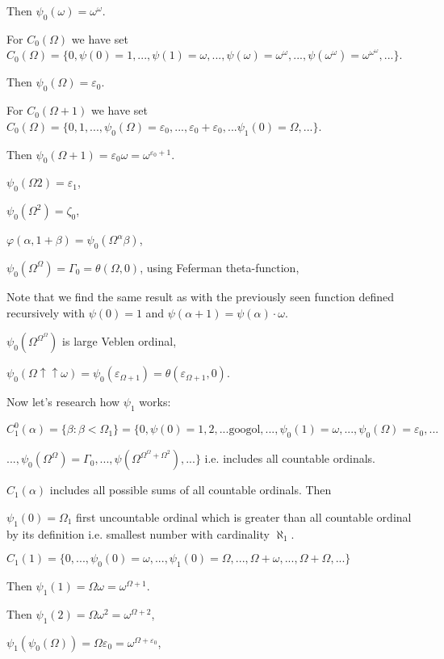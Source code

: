 \documentclass[10pt]{article}
\begin{document}
Then \(\psi_0(\omega)=\omega^\omega\).

For \(C_0(\Omega)\) we have set \(C_0(\Omega)=\{0,\psi(0)=1,...,\psi(1)=\omega,...,\psi(\omega)=\omega^\omega,...,\psi(\omega^\omega)=\omega^{\omega^\omega},...\}\).

Then \(\psi_0(\Omega)=\varepsilon_0\).

For \(C_0(\Omega+1)\) we have set \(C_0(\Omega)=\{0,1,...,\psi_0(\Omega)=\varepsilon_0,...,\varepsilon_0+\varepsilon_0,...\psi_1(0)=\Omega,...\}\).

Then \(\psi_0(\Omega+1)=\varepsilon_0\omega=\omega^{\varepsilon_0+1}\).

\(\psi_0(\Omega2)=\varepsilon_1\),

\(\psi_0(\Omega^2)=\zeta_0\),

\(\varphi(\alpha,1+\beta)=\psi_0(\Omega^\alpha\beta)\),

\(\psi_0(\Omega^\Omega)=\Gamma_0=\theta(\Omega,0)\), using Feferman theta-function,

Note that we find the same result as with the previously seen function defined recursively with \( \psi(0) = 1 \) and \( \psi(\alpha+1) = \psi(\alpha) \cdot \omega \).

\(\psi_0(\Omega^{\Omega^\Omega})\) is large Veblen ordinal,

\(\psi_0(\Omega\uparrow\uparrow\omega)=\psi_0(\varepsilon_{\Omega+1})=\theta(\varepsilon_{\Omega+1},0)\).

Now let's research how \(\psi_1\) works:

\(C_1^0(\alpha)=\{\beta:\beta<\Omega_1\}=\{0,\psi(0)=1,2,...\text{googol},...,\psi_0(1)=\omega,...,\psi_0(\Omega)=\varepsilon_0,...\)

\(...,\psi_0(\Omega^\Omega)=\Gamma_0,...,\psi(\Omega^{\Omega^\Omega+\Omega^2}),...\}\) i.e. includes all countable ordinals.

\(C_1(\alpha)\) includes all possible sums of all countable ordinals. Then

\(\psi_1(0)=\Omega_1\) first uncountable ordinal which is greater than all countable ordinal by its definition i.e. smallest number with cardinality \(\aleph_1\).

\(C_1(1)=\{0,...,\psi_0(0)=\omega,...,\psi_1(0)=\Omega,...,\Omega+\omega,...,\Omega+\Omega,...\}\)

Then \(\psi_1(1)=\Omega\omega=\omega^{\Omega+1}\).

Then \(\psi_1(2)=\Omega\omega^2=\omega^{\Omega+2}\),

\(\psi_1(\psi_0(\Omega))=\Omega\varepsilon_0=\omega^{\Omega+\varepsilon_0}\),
\end{document}
